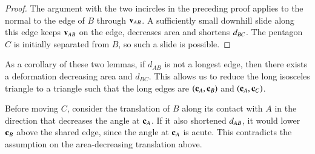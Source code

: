 \begin{proof}
The argument with the two incircles in the preceding proof applies
to the normal to the edge of $B$ through ${\mathbf v}_{AB}$. A sufficiently
small downhill slide along this edge keeps ${\mathbf v}_{AB}$ on the edge,
decreases area and shortens $d_{BC}$. The pentagon $C$ is initially
separated from $B$, so such a slide is possible.
\end{proof}

As a corollary of these two lemmas, if $d_{AB}$ is not a longest edge,
then there exists a deformation decreasing area and $d_{BC}$.  This
allows us to reduce the long isosceles triangle to a triangle such
that the long edges are $({\mathbf c}_A,{\mathbf c}_B)$ and $({\mathbf c}_A,{\mathbf c}_C)$.

Before moving $C$, consider the translation of $B$ along its contact
with $A$ in the direction that decreases the angle at ${\mathbf c}_A$.
If it also shortened $d_{AB}$, it would lower ${\mathbf c}_B$ above the
shared edge, since the angle at ${\mathbf c}_A$ is acute. This contradicts
the assumption on the area-decreasing translation above.

